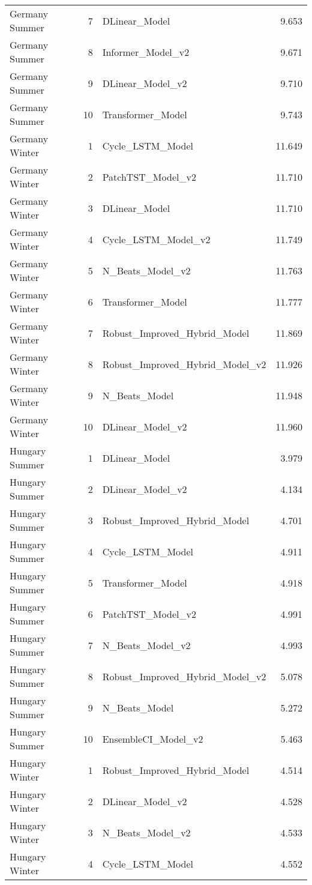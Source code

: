 \begin{tabular}{l r l r}
Germany Summer & 7 & DLinear\_Model & 9.653 \\
Germany Summer & 8 & Informer\_Model\_v2 & 9.671 \\
Germany Summer & 9 & DLinear\_Model\_v2 & 9.710 \\
Germany Summer & 10 & Transformer\_Model & 9.743 \\
Germany Winter & 1 & Cycle\_LSTM\_Model & 11.649 \\
Germany Winter & 2 & PatchTST\_Model\_v2 & 11.710 \\
Germany Winter & 3 & DLinear\_Model & 11.710 \\
Germany Winter & 4 & Cycle\_LSTM\_Model\_v2 & 11.749 \\
Germany Winter & 5 & N\_Beats\_Model\_v2 & 11.763 \\
Germany Winter & 6 & Transformer\_Model & 11.777 \\
Germany Winter & 7 & Robust\_Improved\_Hybrid\_Model & 11.869 \\
Germany Winter & 8 & Robust\_Improved\_Hybrid\_Model\_v2 & 11.926 \\
Germany Winter & 9 & N\_Beats\_Model & 11.948 \\
Germany Winter & 10 & DLinear\_Model\_v2 & 11.960 \\
Hungary Summer & 1 & DLinear\_Model & 3.979 \\
Hungary Summer & 2 & DLinear\_Model\_v2 & 4.134 \\
Hungary Summer & 3 & Robust\_Improved\_Hybrid\_Model & 4.701 \\
Hungary Summer & 4 & Cycle\_LSTM\_Model & 4.911 \\
Hungary Summer & 5 & Transformer\_Model & 4.918 \\
Hungary Summer & 6 & PatchTST\_Model\_v2 & 4.991 \\
Hungary Summer & 7 & N\_Beats\_Model\_v2 & 4.993 \\
Hungary Summer & 8 & Robust\_Improved\_Hybrid\_Model\_v2 & 5.078 \\
Hungary Summer & 9 & N\_Beats\_Model & 5.272 \\
Hungary Summer & 10 & EnsembleCI\_Model\_v2 & 5.463 \\
Hungary Winter & 1 & Robust\_Improved\_Hybrid\_Model & 4.514 \\
Hungary Winter & 2 & DLinear\_Model\_v2 & 4.528 \\
Hungary Winter & 3 & N\_Beats\_Model\_v2 & 4.533 \\
Hungary Winter & 4 & Cycle\_LSTM\_Model & 4.552 \\

\end{tabular}
